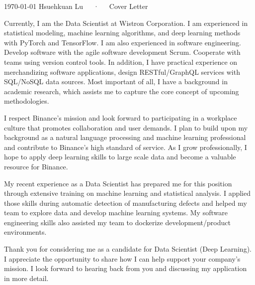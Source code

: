 \documentclass[11pt, a4paper]{awesome-cv}
\begin{document}
\makecvheader[R]

\makecvfooter
  {\today}
  {Hsuehkuan Lu~~~·~~~Cover Letter}
  {}

\makelettertitle

\begin{cvletter}

Currently, I am the Data Scientist at Wistron Corporation.
I am experienced in statistical modeling, machine learning algorithms, and deep learning methods with PyTorch and TensorFlow.
I am also experienced in software engineering. Develop software with the agile software development Scrum. Cooperate with teams using version control tools.
In addition, I have practical experience on merchandizing software applications, design RESTful/GraphQL services with SQL/NoSQL data sources.
Most important of all, I have a background in academic research, which assists me to capture the core concept of upcoming methodologies.

I respect Binance's mission and look forward to participating in a workplace culture that promotes collaboration and user demands.
I plan to build upon my background as a natural language processing and machine learning professional and contribute to Binance's high standard of service.
As I grow professionally, I hope to apply deep learning skills to large scale data and become a valuable resource for Binance.

My recent experience as a Data Scientist has prepared me for this position through extensive training on machine learning and statistical analysis.
I applied those skills during automatic detection of manufacturing defects and helped my team to explore data and develop machine learning systems.
My software engineering skills also assisted my team to dockerize development/product environments.

\end{cvletter}

Thank you for considering me as a candidate for Data Scientist (Deep Learning).
I appreciate the opportunity to share how I can help support your company's mission.
I look forward to hearing back from you and discussing my application in more detail.


\makeletterclosing
\end{document}
